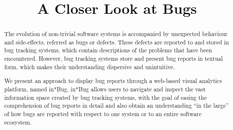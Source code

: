 


\usepackage{xspace,graphicx,url,paralist} %

\usepackage{xcolor,colortbl}


\newcommand{\ie}{\textit{i.e.,}\xspace}
\newcommand{\eg}{\textit{e.g.,}\xspace}
\newcommand{\etc}{\textit{etc.}\xspace}
\newcommand{\etal}{\textit{et al.}\xspace}
\newcommand{\ib}{in*Bug\xspace}
\newcommand{\secref}[1]{Section~\ref{#1}\xspace}
\newcommand{\figref}[1]{Figure~\ref{#1}\xspace}
\newcommand{\tabref}[1]{Table~\ref{#1}\xspace}


\title{A Closer Look at Bugs}


\author{
}



\maketitle


\begin{abstract}


The evolution of non-trivial software systems is accompanied by unexpected behaviour and side-effects, referred as bugs or defects. These defects are reported to and stored in bug tracking systems, which contain descriptions of the problems that have been encountered. However, bug tracking systems store and present bug reports in textual form, which makes their understanding dispersive and unintuitive.

We present an approach to display bug reports through a web-based visual analytics platform, named in*Bug. \ib allows users to navigate and inspect the vast information space created by bug tracking systems, with the goal of easing the comprehension of bug reports in detail and also obtain an understanding ``in the large'' of how bugs are reported with respect to one system or to an entire software ecosystem.

\end{abstract}


